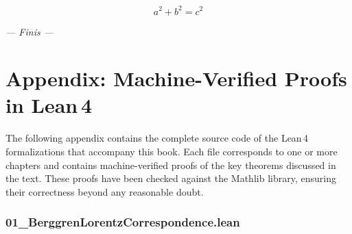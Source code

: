 \documentclass[11pt,openright,twoside]{book}
\theoremstyle{definition}
\begin{document}
\bigskip


\[
\boxed{a^2 + b^2 = c^2}
\]


\bigskip


\textit{--- Finis ---}


\clearpage

\backmatter

\chapter*{Appendix: Machine-Verified Proofs in Lean\,4}

\vspace{0.5cm}
\noindent
The following appendix contains the complete source code of the Lean\,4
formalizations that accompany this book. Each file corresponds to one or
more chapters and contains machine-verified proofs of the key theorems
discussed in the text. These proofs have been checked against the
Mathlib library, ensuring their correctness beyond any reasonable doubt.

\vspace{0.5cm}


\subsection*{01\_BerggrenLorentzCorrespondence.lean}
\label{lean:01_BerggrenLorentzCorrespondence}
\end{document}
